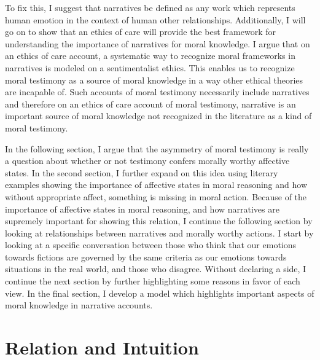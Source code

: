 \documentclass[phdthesis,12pt,final]{wuthesis}
\theoremstyle{definition}
\theoremstyle{definition}
\theoremstyle{definition}
\theoremstyle{definition}
\theoremstyle{remark}
\begin{document}
To fix this, I suggest that narratives be defined as any work which represents human emotion in the context of human other relationships. Additionally, I will go on to show that an ethics of care will provide the best framework for understanding the importance of narratives for moral knowledge. I argue that on an ethics of care account, a systematic way to recognize moral frameworks in narratives is modeled on a sentimentalist ethics. This enables us to recognize moral testimony as a source of moral knowledge in a way other ethical theories are incapable of. Such accounts of moral testimony necessarily include narratives and therefore on an ethics of care account of moral testimony, narrative is an important source of moral knowledge not recognized in the literature as a kind of moral testimony.

In the following section, I argue that the asymmetry of moral testimony is really a question about whether or not testimony confers morally worthy affective states. In the second section, I further expand on this idea using literary examples showing the importance of affective states in moral reasoning and how without appropriate affect, something is missing in moral action. Because of the importance of affective states in moral reasoning, and how narratives are supremely important for showing this relation, I continue the following section by looking at relationships between narratives and morally worthy actions. I start by looking at a specific conversation between those who think that our emotions towards fictions are governed by the same criteria as our emotions towards situations in the real world, and those who disagree. Without declaring a side, I continue the next section by further highlighting some reasons in favor of each view. In the final section, I develop a model which highlights important aspects of moral knowledge in narrative accounts.

\chapter{Relation and Intuition}\label{rel-int}
\end{document}
